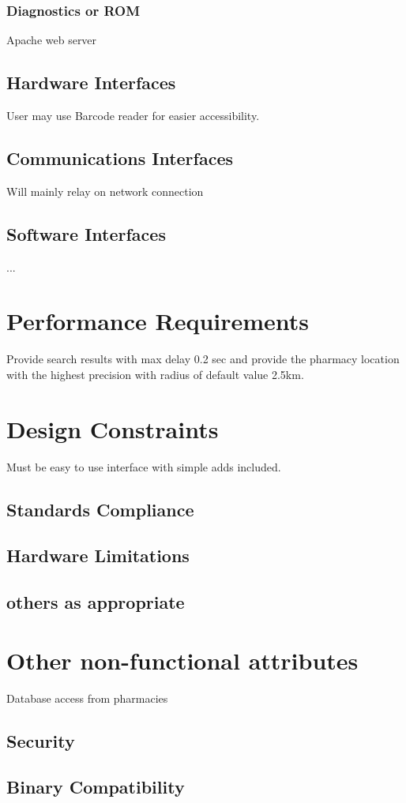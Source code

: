 \documentclass[]{article}
\begin{document}
\subsubsection {Diagnostics or ROM}
Apache web server

\subsection{Hardware Interfaces}
User may use Barcode reader for easier accessibility.
\subsection{Communications Interfaces}
Will mainly relay on network connection
\subsection{Software Interfaces}
... 
\section{Performance Requirements}
Provide search results with max delay 0.2 sec 
and provide the pharmacy location with the highest precision with radius of default value 2.5km.
\section{Design Constraints}
Must be easy to use interface with simple adds included.
\subsection{ Standards Compliance}
\subsection{ Hardware Limitations}
\subsection{ others as appropriate}

\section{Other non-functional attributes}
Database access from pharmacies
\subsection {Security}
\subsection {Binary Compatibility}
\end{document}
